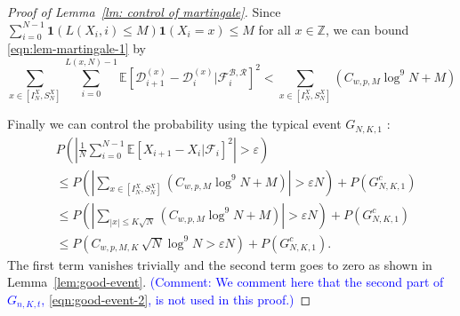 \documentclass[twoside,12pt, a4paper]{article}
\numberwithin{equation}{section}
\theoremstyle{remark}
\newcommand{\comment}[1]{\textcolor{blue}{(Comment: #1)}}
\begin{document}
\begin{proof}[Proof of Lemma~\ref{lm: control of martingale}]
	Since $\sum_{i = 0}^{N-1} \mathbf{1}\left( L(X_i, i) \le M \right) \mathbf{1}(X_i = x) \le  M$ for all $x \in \mathbb{Z}$, we can bound \eqref{eqn:lem-martingale-1} by
	\begin{equation*}
		\sum_{x \in \left[ I_N^X, S_N^X \right]} \sum_{i = 0}^{L(x,N) - 1} \mathbb{E}\left[ \mathcal{D}_{i+1}^{(x)} - \mathcal{D}_i^{(x)} | \mathcal{F}_{i}^{\mathcal{B}, \mathcal{R}} \right]^2 
		< \sum_{x \in \left[ I_N^X, S_N^X \right]} (C_{w, p, M} \log^9 N +M )
	\end{equation*}
	
	Finally we can control the probability using the typical event $G_{N, K, 1}$ :
	\begin{align*}
		&P\left( \left| \frac{1}{N} \sum_{i = 0}^{N-1} \mathbb{E}\left[ X_{i+1} - X_i | \mathcal{F}_i \right]^2  \right|  > \varepsilon \right)\\
		&\le P\left( \left| \sum_{x \in \left[ I_N^X, S_N^X \right]} (C_{w, p, M} \log^9 N +M ) \right| > \varepsilon  N \right) + P\left( G_{N, K, 1}^c \right)  \\
		&\le P\left(  \left| \sum_{|x| \le K \sqrt{N} } (C_{w, p, M} \log^9 N +M ) \right| > \varepsilon  N  \right) + P\left( G_{N, K, 1}^c \right)  \\
		&\le P\left(  C_{w, p, M, K} \, \sqrt{N} \log^9 N > \varepsilon  N  \right) + P\left( G_{N, K, 1}^c \right) 
		.\end{align*}
		The first term vanishes trivially and the second term goes to zero as shown in Lemma~\ref{lem:good-event}. 
		\comment{We comment here that the second part of $G_{n, K, t}$, \eqref{eqn:good-event-2}, is not used in this proof.}
	\end{proof}

	
	
\end{document}
